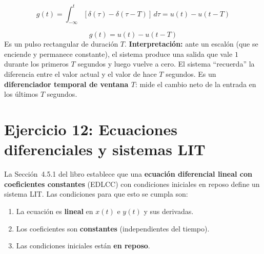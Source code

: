 \documentclass[10pt,a4paper]{article}
\begin{document}
\begin{enumerate}[label=\textbf{\alph*)}]
		\[
		g(t) = \int_{-\infty}^{t} [\delta(\tau) - \delta(\tau - T)]\,d\tau = u(t) - u(t-T)
		\]
		
		\[
		\boxed{g(t) = u(t) - u(t-T)}
		\]
		Es un pulso rectangular de duración $T$. \textbf{Interpretación:} ante un escalón (que se enciende y permanece constante), el sistema produce una salida que vale $1$ durante los primeros $T$ segundos y luego vuelve a cero. El sistema ``recuerda'' la diferencia entre el valor actual y el valor de hace $T$ segundos. Es un \textbf{diferenciador temporal de ventana $T$}: mide el cambio neto de la entrada en los últimos $T$ segundos.
	\end{enumerate}

	\section*{Ejercicio 12: Ecuaciones diferenciales y sistemas LIT}
	
	La Sección~4.5.1 del libro establece que una \textbf{ecuación diferencial lineal con coeficientes constantes} (EDLCC) con condiciones iniciales en reposo define un sistema LIT. Las condiciones para que esto se cumpla son:
	\begin{enumerate}
		\item La ecuación es \textbf{lineal} en $x(t)$ e $y(t)$ y sus derivadas.
		\item Los coeficientes son \textbf{constantes} (independientes del tiempo).
		\item Las condiciones iniciales están \textbf{en reposo}.
	\end{enumerate}
	
\end{document}
